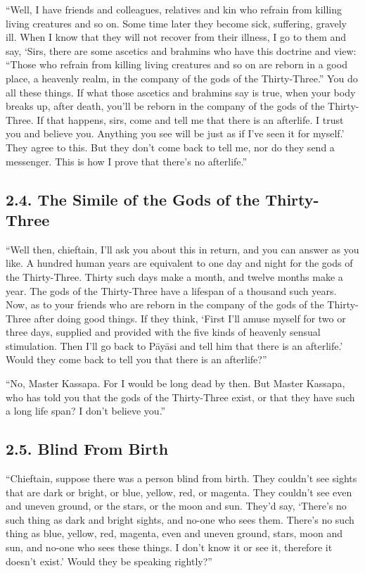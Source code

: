 \documentclass[12pt,openany]{book}%
\begin{document}
“Well, I have friends and colleagues, relatives and kin who refrain from killing living creatures and so on. Some time later they become sick, suffering, gravely ill. When I know that they will not recover from their illness, I go to them and say, ‘Sirs, there are some ascetics and brahmins who have this doctrine and view: “Those who refrain from killing living creatures and so on are reborn in a good place, a heavenly realm, in the company of the gods of the Thirty-Three.” You do all these things. If what those ascetics and brahmins say is true, when your body breaks up, after death, you’ll be reborn in the company of the gods of the Thirty-Three. If that happens, sirs, come and tell me that there is an afterlife. I trust you and believe you. Anything you see will be just as if I’ve seen it for myself.’ They agree to this. But they don’t come back to tell me, nor do they send a messenger. This is how I prove that there’s no afterlife.” 

\subsection*{2.4. The Simile of the Gods of the Thirty-Three }

“Well then, chieftain, I’ll ask you about this in return, and you can answer as you like. A hundred human years are equivalent to one day and night for the gods of the Thirty-Three. Thirty such days make a month, and twelve months make a year. The gods of the Thirty-Three have a lifespan of a thousand such years. Now, as to your friends who are reborn in the company of the gods of the Thirty-Three after doing good things. If they think, ‘First I’ll amuse myself for two or three days, supplied and provided with the five kinds of heavenly sensual stimulation. Then I’ll go back to \textsanskrit{Pāyāsi} and tell him that there is an afterlife.’ Would they come back to tell you that there is an afterlife?” 

“No, Master Kassapa. For I would be long dead by then. But Master Kassapa, who has told you that the gods of the Thirty-Three exist, or that they have such a long life span? I don’t believe you.” 

\subsection*{2.5. Blind From Birth }

“Chieftain, suppose there was a person blind from birth. They couldn’t see sights that are dark or bright, or blue, yellow, red, or magenta. They couldn’t see even and uneven ground, or the stars, or the moon and sun. They’d say, ‘There’s no such thing as dark and bright sights, and no-one who sees them. There’s no such thing as blue, yellow, red, magenta, even and uneven ground, stars, moon and sun, and no-one who sees these things. I don’t know it or see it, therefore it doesn’t exist.’ Would they be speaking rightly?” 
\end{document}
